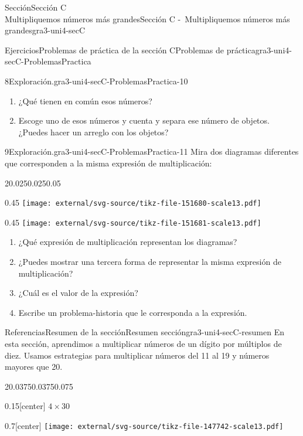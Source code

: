 \begin{sectionptx}{Sección}{{\Large Sección C\\}Multipliquemos números más grandes}{}{Sección C -~Multipliquemos números más grandes}{}{}{gra3-uni4-secC}
\begin{exercises-subsection}{Ejercicios}{Problemas de práctica de la sección C}{}{Problemas de práctica}{}{}{gra3-uni4-secC-ProblemasPractica}
\begin{divisionexercise}{8}{Exploración.}{}{gra3-uni4-secC-ProblemasPractica-10}
\begin{enumerate}[label={(\alph*)}]
\item{}¿Qué tienen en común esos números?%
\item{}Escoge uno de esos números y cuenta y separa ese número de objetos. ¿Puedes hacer un arreglo con los objetos?%
\end{enumerate}
\end{divisionexercise}%
\begin{divisionexercise}{9}{Exploración.}{}{gra3-uni4-secC-ProblemasPractica-11}%
Mira dos diagramas diferentes que corresponden a la misma expresión de multiplicación:%
\begin{sidebyside}{2}{0.025}{0.025}{0.05}%
\begin{sbspanel}{0.45}%
\texttt{[image: external/svg-source/tikz-file-151680-scale13.pdf]}
\end{sbspanel}%
\begin{sbspanel}{0.45}%
\texttt{[image: external/svg-source/tikz-file-151681-scale13.pdf]}
\end{sbspanel}%
\end{sidebyside}%
%
\begin{enumerate}[label={(\alph*)}]
\item{}¿Qué expresión de multiplicación representan los diagramas?%
\item{}¿Puedes mostrar una tercera forma de representar la misma expresión de multiplicación?%
\item{}¿Cuál es el valor de la expresión?%
\item{}Escribe un problema-historia que le corresponda a la expresión.%
\end{enumerate}
\end{divisionexercise}%
\end{exercises-subsection}
%
%
\typeout{************************************************}
\typeout{************************************************}
%
\clearpage
\begin{references-subsection}{Referencias}{Resumen de la sección}{}{Resumen sección}{}{}{gra3-uni4-secC-resumen}
En esta sección, aprendimos a multiplicar números de un dígito por múltiplos de diez. Usamos estrategias para multiplicar números del 11 al 19 y números mayores que 20.%
\begin{sidebyside}{2}{0.0375}{0.0375}{0.075}%
\begin{sbspanel}{0.15}[center]%
\(4\times 30\)%
\end{sbspanel}%
\begin{sbspanel}{0.7}[center]%
\texttt{[image: external/svg-source/tikz-file-147742-scale13.pdf]}

\end{sbspanel}
\end{sidebyside}
\end{references-subsection}
\end{sectionptx}
